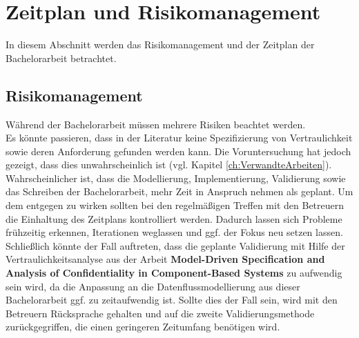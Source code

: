 
\chapter{Zeitplan und Risikomanagement}
\label{ch:Zeitplan}
In diesem Abschnitt werden das Risikomanagement und der Zeitplan der Bachelorarbeit betrachtet.
\section{Risikomanagement}
Während der Bachelorarbeit müssen mehrere Risiken beachtet werden. \\

Es könnte passieren, dass in der Literatur keine Spezifizierung von Vertraulichkeit sowie deren Anforderung gefunden werden kann. Die Voruntersuchung hat jedoch gezeigt, dass dies unwahrscheinlich ist (vgl. Kapitel \ref{ch:VerwandteArbeiten}). \\

Wahrscheinlicher ist, dass die Modellierung, Implementierung, Validierung sowie das Schreiben der Bachelorarbeit,  mehr Zeit in Anspruch nehmen als geplant. Um dem entgegen zu wirken sollten bei den regelmäßigen Treffen mit den Betreuern die Einhaltung des Zeitplans kontrolliert werden. Dadurch lassen sich Probleme frühzeitig erkennen, Iterationen weglassen und ggf. der Fokus neu setzen lassen. \\

Schließlich könnte der Fall auftreten, dass die geplante Validierung mit Hilfe der Vertraulichkeitsanalyse aus der Arbeit \textbf{Model-Driven Specification and Analysis of Confidentiality in Component-Based Systems} \cite{Kramera} zu aufwendig sein wird, da die Anpassung an die Datenflussmodellierung aus dieser Bachelorarbeit ggf. zu zeitaufwendig ist. Sollte dies der Fall sein, wird mit den Betreuern Rücksprache gehalten und auf die zweite Validierungsmethode zurückgegriffen, die einen geringeren Zeitumfang benötigen wird. 

